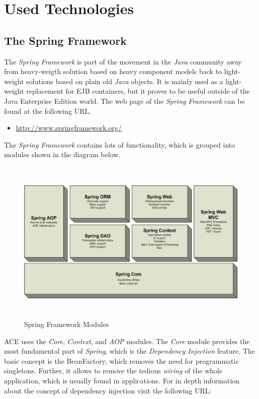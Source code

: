 \chapter{Used Technologies}

\section{The Spring Framework}

The \emph{Spring Framework} is part of the movement in the \emph{Java}
community away from heavy-weigth solution based on heavy component models
back to light-weight solutions based on plain old \emph{Java} objects. It
is mainly used as a light-weight replacement for EJB containers, but it
proves to be useful outside of the Java Enterprise Edition world. The 
web page of the \emph{Spring Framework} can be found at the following
URL.

\begin{itemize}
 \item \href{http://www.springframework.org/}{http://www.springframework.org/}
\end{itemize}

The \emph{Spring Framework} contains lots of functionality, which is grouped
into modules shown in the diagram below.

\begin{figure}[H]
 \centering
 \includegraphics[width=15cm,height=7.9cm]{../images/finalreport/spring-overview.eps}
 \caption{Spring Framework Modules}
\end{figure}

ACE uses the \emph{Core}, \emph{Context}, and \emph{AOP} modules. The
\emph{Core} module provides the most fundamental part of \emph{Spring}, which
is the \emph{Dependency Injection} feature. The basic concept is the
BeanFactory, which removes the need for programmatic singletons. Further, it
allows to remove the tedious \emph{wiring} of the whole application, which
is usually found in applications. For in depth information about
the concept of dependency injection visit the following URL:

